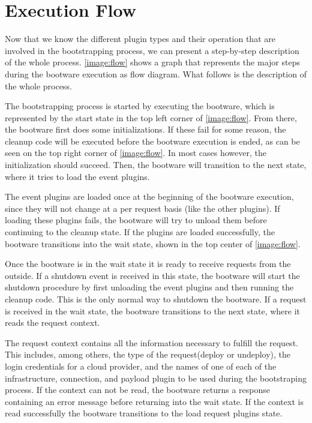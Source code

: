 \section{Execution Flow}
\label{flow}

Now that we know the different plugin types and their operation that are involved in the bootstrapping process, we can present a step-by-step description of the whole process.
\autoref{image:flow} shows a graph that represents the major steps during the bootware execution as flow diagram.
What follows is the description of the whole process.

The bootstrapping process is started by executing the bootware, which is represented by the start state in the top left corner of \autoref{image:flow}.
From there, the bootware first does some initializations.
If these fail for some reason, the cleanup code will be executed before the bootware execution is ended, as can be seen on the top right corner of \autoref{image:flow}.
In most cases however, the initialization should succeed.
Then, the bootware will transition to the next state, where it tries to load the event plugins.

The event plugins are loaded once at the beginning of the bootware execution, since they will not change at a per request basis (like the other plugins).
If loading these plugins fails, the bootware will try to unload them before continuing to the cleanup state.
If the plugins are loaded successfully, the bootware transitions into the wait state, shown in the top center of \autoref{image:flow}.

Once the bootware is in the wait state it is ready to receive requests from the outside.
If a shutdown event is received in this state, the bootware will start the shutdown procedure by first unloading the event plugins and then running the cleanup code.
This is the only normal way to shutdown the bootware.
If a request is received in the wait state, the bootware transitions to the next state, where it reads the request context.

The request context contains all the information necessary to fulfill the request.
This includes, among others, the type of the request(deploy or undeploy), the login credentials for a cloud provider, and the names of one of each of the infrastructure, connection, and payload plugin to be used during the bootstraping process.
If the context can not be read, the bootware returns a response containing an error message before returning into the wait state.
If the context is read successfully the bootware transitions to the load request plugins state.


